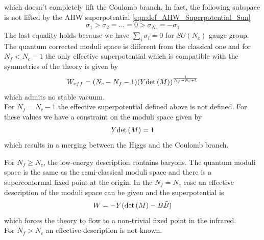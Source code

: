 which doesn't completely lift the Coulomb branch.
In fact, the following subspace is not lifted by the AHW superpotential \eqref{eqn:def_AHW_Superpotential_Sun}
\begin{equation}
 \sigma_1 > \sigma_2 = \dots = 0 > \sigma_{N_c} = - \sigma_1
 \label{eqn:ahw_subspace_unlifted}
\end{equation}
The last equality holds because we have $\sum_i \sigma_i = 0$ for $SU(N_c)$ gauge group.
The quantum corrected moduli space is different from the classical one and for $N_f < N_c -1 $ the only effective superpotential which is compatible with the symmetries of the theory is given by \cite{Aharony:1997bx}
\begin{equation}
 W_{eff} = (N_c - N_f - 1) ( Y \mathrm{det } \,{(M)} ) ^{\frac{1}{N_f - N_c +1}}
\end{equation}
which admits no stable vacuum.\\
For $N_f = N_c - 1 $ the effective superpotential defined above is not defined.
For these values we have a constraint on the moduli space given by \cite{Aharony:1997bx} 
\begin{equation}
Y \mathrm{det } \,( M) = 1
\label{eqn:suN-3d-nf-nc-1-vacuum}
\end{equation}
which results in a merging between the Higgs and the Coulomb branch.

For $N_f \geq N_c $, the low-energy description contains baryons.
The quantum moduli space is the same as the semi-classical moduli space and there is a superconformal fixed point at the origin.
In the $N_f = N_c$ case an effective description of the moduli space can be given and the superpotential is \cite{Aharony:1997bx}
\begin{equation}
W = - Y ( \mathrm{det } \,{(M)} - B \tilde{B})
\label{eqn:3d_sun_nf__n_c_superpot}
\end{equation}
which forces the theory to flow to a non-trivial fixed point in the infrared.\\
For $N_f >N_c$ an effective description is not known.


